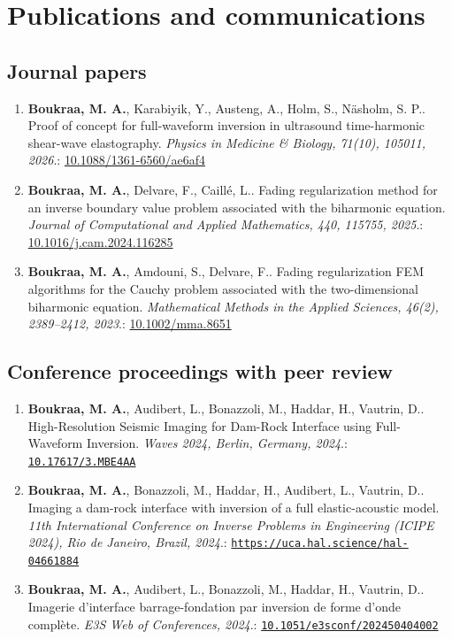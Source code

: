 \documentclass[10pt]{article} %
\begin{document}
\section{Publications and communications}
\subsection{Journal papers}
\begin{enumerate}
\item \textbf{Boukraa, M. A.}, Karabiyik, Y., Austeng, A., Holm, S., Näsholm, S. P.. Proof of concept for full-waveform inversion in ultrasound time-harmonic shear-wave elastography. \textit{Physics in Medicine \& Biology, 71(10), 105011, 2026}.: \href{https://doi.org/10.1088/1361-6560/ae6af4}{10.1088/1361-6560/ae6af4}
\item \textbf{Boukraa, M. A.}, Delvare, F., Caill{\'e}, L.. Fading regularization method for an inverse boundary value problem associated with the biharmonic equation. \textit{Journal of Computational and Applied Mathematics, 440, 115755, 2025}.: \href{https://doi.org/10.1016/j.cam.2024.116285}{10.1016/j.cam.2024.116285}
\item \textbf{Boukraa, M. A.}, Amdouni, S., Delvare, F.. Fading regularization FEM algorithms for the Cauchy problem associated with the two-dimensional biharmonic equation. \textit{Mathematical Methods in the Applied Sciences, 46(2), 2389--2412, 2023}.: \href{https://doi.org/10.1002/mma.8651}{10.1002/mma.8651}
\end{enumerate}

\subsection{Conference proceedings with peer review}
\begin{enumerate}
\item \textbf{Boukraa, M. A.}, Audibert, L., Bonazzoli, M., Haddar, H., Vautrin, D.. High-Resolution Seismic Imaging for Dam-Rock Interface using Full-Waveform Inversion. \textit{Waves 2024, Berlin, Germany, 2024}.: \href{https://doi.org/10.17617/3.MBE4AA}{\nolinkurl{10.17617/3.MBE4AA}}
\item \textbf{Boukraa, M. A.}, Bonazzoli, M., Haddar, H., Audibert, L., Vautrin, D.. Imaging a dam-rock interface with inversion of a full elastic-acoustic model. \textit{11th International Conference on Inverse Problems in Engineering (ICIPE 2024), Rio de Janeiro, Brazil, 2024}.: \href{https://uca.hal.science/hal-04661884}{\nolinkurl{https://uca.hal.science/hal-04661884}}
\item \textbf{Boukraa, M. A.}, Audibert, L., Bonazzoli, M., Haddar, H., Vautrin, D.. Imagerie d’interface barrage-fondation par inversion de forme d’onde complète. \textit{E3S Web of Conferences, 2024}.: \href{https://doi.org/10.1051/e3sconf/202450404002}{\nolinkurl{10.1051/e3sconf/202450404002}}
\end{enumerate}
\end{document}

